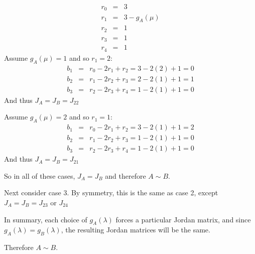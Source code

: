 \documentclass[letterpaper,12pt,fleqn]{article}
\renewcommand{\l}{\lambda}
\newcommand{\m}{\mu}
\begin{document}
\begin{enumerate}
\begin{enumerate}
    \begin{eqnarray*}
      r_0 &=& 3 \\
      r_1 &=& 3-g_A(\m) \\
      r_2 &=& 1 \\
      r_3 &=& 1 \\
      r_4 &=& 1
    \end{eqnarray*}
    Assume $g_A(\m)=1$ and so $r_1=2$:
    \begin{eqnarray*}
      b_1 &=& r_0-2r_1+r_2=3-2(2)+1=0 \\
      b_2 &=& r_1-2r_2+r_3=2-2(1)+1=1 \\
      b_3 &=& r_2-2r_3+r_4=1-2(1)+1=0
    \end{eqnarray*}
    And thus $J_A=J_B=J_{22}$

    Assume $g_A(\m)=2$ and so $r_1=1$:
    \begin{eqnarray*}
      b_1 &=& r_0-2r_1+r_2=3-2(1)+1=2 \\
      b_2 &=& r_1-2r_2+r_3=1-2(1)+1=0 \\
      b_3 &=& r_2-2r_3+r_4=1-2(1)+1=0
    \end{eqnarray*}
    And thus $J_A=J_B=J_{21}$

    So in all of these cases, $J_A=J_B$ and therefore $A\sim B$.

    Next consider case 3. By symmetry, this is the same as case 2, except
    $J_A=J_B=J_{23}$ or $J_{24}$

    In summary, each choice of $g_A(\l)$ forces a particular Jordan matrix, and since
    $g_A(\l)=g_B(\l)$, the resulting Jordan matrices will be the same.

    Therefore $A\sim B$.
\end{enumerate}
\end{enumerate}
\end{document}
